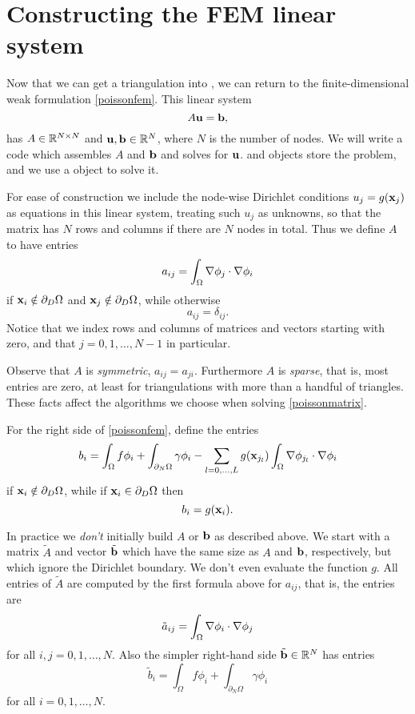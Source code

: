 \section{Constructing the FEM linear system}

Now that we can get a triangulation into \PETSc, we can return to the finite-dimensional weak formulation \eqref{poissonfem}.  This linear system
\begin{equation}
A \mathbf{u} = \mathbf{b}, \label{poissonmatrix}
\end{equation}
has $A\in\mathbb{R}^{N\times N}$ and $\mathbf{u},\mathbf{b}\in\mathbb{R}^N$, where $N$ is the number of nodes.  We will write a code which assembles $A$ and $\mathbf{b}$ and solves for $\mathbf{u}$.  \PETSc \pMat and \pVec objects store the problem, and we use a \pKSP object to solve it.

For ease of construction we include the node-wise Dirichlet conditions $u_j=g(\mathbf{x}_j)$ as equations in this linear system, treating such $u_j$ as unknowns, so that the matrix has $N$ rows and columns if there are $N$ nodes in total.  Thus we define $A$ to have entries
\begin{equation}
a_{ij} = \int_\Omega \nabla \phi_j \cdot \nabla \phi_i \label{Aentryfem}
\end{equation}
if $\mathbf{x}_i \notin \partial_D \Omega$ and $\mathbf{x}_j \notin \partial_D \Omega$, while otherwise
\begin{equation*}
a_{ij} = \delta_{ij}.
\end{equation*}
Notice that we index rows and columns of matrices and vectors starting with zero, and that $j=0,1,\dots,N-1$ in particular.

Observe that $A$ is \emph{symmetric}, $a_{ij}=a_{ji}$.  Furthermore $A$ is \emph{sparse}, that is, most entries are zero, at least for triangulations with more than a handful of triangles.  These facts affect the algorithms we choose when solving \eqref{poissonmatrix}.

For the right side of \eqref{poissonfem}, define the entries
\begin{equation}
    b_i = \int_\Omega f \phi_i + \int_{\partial_N\Omega} \gamma \phi_i - \sum_{l=0,\dots,L} g(\mathbf{x}_{j_l})  \int_\Omega \nabla \phi_{j_l} \cdot \nabla \phi_i  \label{bentryfem}
\end{equation}
if $\mathbf{x}_i \notin \partial_D \Omega$, while if $\mathbf{x}_i \in \partial_D \Omega$ then
    $$b_i = g(\mathbf{x}_{i}).$$

In practice we \emph{don't} initially build $A$ or $\mathbf{b}$ as described above.  We start with a matrix $\tilde A$ and vector $\tilde {\mathbf{b}}$ which have the same size as $A$ and $\mathbf{b}$, respectively, but which ignore the Dirichlet boundary.  We don't even evaluate the function $g$.  All entries of $\tilde A$ are computed by the first formula above for $a_{ij}$, that is, the entries are
\begin{equation*}
\tilde a_{ij} = \int_\Omega \nabla \phi_i \cdot \nabla \phi_j
\end{equation*}
for all $i,j=0,1,\dots,N$.  Also the simpler right-hand side $\tilde {\mathbf{b}}\in\mathbb{R}^N$ has entries
    $$\tilde b_i = \int_\Omega f \phi_i + \int_{\partial_N\Omega} \gamma \phi_i$$
for all $i=0,1,\dots,N$.


